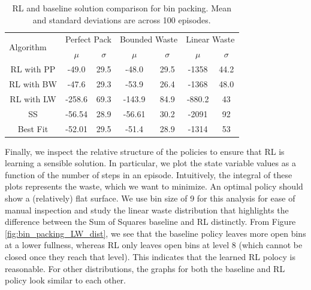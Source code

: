 \documentclass[letterpaper]{article} %
\begin{document}
\begin{table}[h!]
	\resizebox{\columnwidth}{!}
	{%
		\begin{tabular}{|c|cc|cc|cc|}
			\hline
			\multicolumn{1}{|l|}{\multirow{2}{*}{Algorithm}}  & \multicolumn{2}{c|}{Perfect Pack} & \multicolumn{2}{c|}{Bounded Waste}	& \multicolumn{2}{c|}{Linear Waste} \\
			\multicolumn{1}{|l|}{} 											&   $\mu$            &        $\sigma$		& 	$\mu$    			& 	$\sigma$     		 &     $\mu$        &      $\sigma$          \\ \hline
			RL with PP  										  & -49.0     		   &          29.5        	&  	-48.0 	  			  &   29.5	 				 &     -1358       &      44.2     \\ \hline
			RL with BW  									  & -47.6     		   &          29.3        	&  	-53.9 	  			  &   26.4	 				 &     -1368       &      48.0     \\ \hline
			RL with LW 										 &  -258.6     		  &         69.3           &  	-143.9 	  			&   84.9	 			   &     -880.2      &      43     \\ \hline
			SS  											   &  -56.54     	    &         28.9           &    -56.61 	  			&   30.2	 			   &     -2091      &      92     \\ \hline
			Best Fit  															  &  -52.01     	   &          29.5           &  	-51.4 	  			&   28.9	 			   &     -1314     &      53     \\ \hline
		\end{tabular}
	}
	\caption{RL and baseline solution comparison for bin packing. Mean and standard deviations are across 100 episodes.}
	\label{table:bin_packing_RL_baseline_comp}
\end{table}

Finally, we inspect the relative structure of the policies to ensure that RL is learning a sensible solution.  In particular, we plot the state variable values as a function of the number of steps in an episode. Intuitively, the integral of these plots represents the waste, which we want to minimize.  An optimal policy should show a (relatively) flat surface. We use bin size of 9 for this analysis for ease of manual inspection and study the linear waste distribution that highlights the difference between the Sum of Squares baseline and RL distinctly. From Figure \ref{fig:bin_packing_LW_dist}, we see that the baseline policy leaves more open bins at a lower fullness, whereas RL only leaves open bins at level 8 (which cannot be closed once they reach that level). This indicates that the learned RL polocy is reasonable. For other distributions, the graphs for both the baseline and RL policy look similar to each other.
\end{document}
